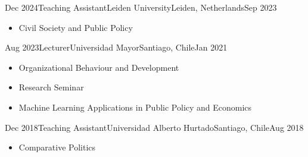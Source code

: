 





\begin{experiences}
  \experience
    {Dec 2024}{Teaching Assistant}{Leiden University}{Leiden, Netherlands}{Sep 2023}
    {\begin{itemize}
    \item Civil Society and Public Policy
    \end{itemize}}
    {}
\end{experiences}
\vspace{-2mm}

\begin{experiences}
  \experience
    {Aug 2023}{Lecturer}{Universidad Mayor}{Santiago, Chile}{Jan 2021}
    {\begin{itemize}
    \item Organizational Behaviour and Development
    \item Research Seminar
    \item Machine Learning Applications in Public Policy and Economics
    \end{itemize}}
    {}
\end{experiences}
\vspace{-2mm}

\begin{experiences}
  \experience
    {Dec 2018}{Teaching Assistant}{Universidad Alberto Hurtado}{Santiago, Chile}{Aug 2018}
    {\begin{itemize}
    \item Comparative Politics
    \end{itemize}}
    {}
\end{experiences}
\vspace{-2mm}

